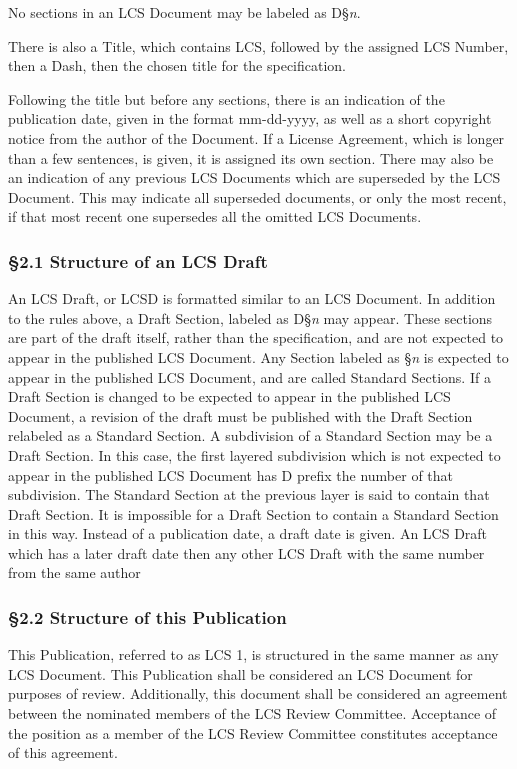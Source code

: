 No sections in an LCS Document may be labeled as D§\emph{n}.

There is also a Title, which contains LCS, followed by the assigned LCS
Number, then a Dash, then the chosen title for the specification.

Following the title but before any sections, there is an indication of
the publication date, given in the format mm-dd-yyyy, as well as a short
copyright notice from the author of the Document. If a License
Agreement, which is longer than a few sentences, is given, it is
assigned its own section. There may also be an indication of any
previous LCS Documents which are superseded by the LCS Document. This
may indicate all superseded documents, or only the most recent, if that
most recent one supersedes all the omitted LCS Documents.

\subsubsection{§2.1 Structure of an LCS
Draft}\label{structure-of-an-lcs-draft}

An LCS Draft, or LCSD is formatted similar to an LCS Document. In
addition to the rules above, a Draft Section, labeled as D§\emph{n} may
appear. These sections are part of the draft itself, rather than the
specification, and are not expected to appear in the published LCS
Document. Any Section labeled as §\emph{n} is expected to appear in the
published LCS Document, and are called Standard Sections. If a Draft
Section is changed to be expected to appear in the published LCS
Document, a revision of the draft must be published with the Draft
Section relabeled as a Standard Section. A subdivision of a Standard
Section may be a Draft Section. In this case, the first layered
subdivision which is not expected to appear in the published LCS
Document has D prefix the number of that subdivision. The Standard
Section at the previous layer is said to contain that Draft Section. It
is impossible for a Draft Section to contain a Standard Section in this
way. Instead of a publication date, a draft date is given. An LCS Draft
which has a later draft date then any other LCS Draft with the same
number from the same author

\subsubsection{§2.2 Structure of this
Publication}\label{structure-of-this-publication}

This Publication, referred to as LCS 1, is structured in the same manner
as any LCS Document. This Publication shall be considered an LCS
Document for purposes of review. Additionally, this document shall be
considered an agreement between the nominated members of the LCS Review
Committee. Acceptance of the position as a member of the LCS Review
Committee constitutes acceptance of this agreement.

